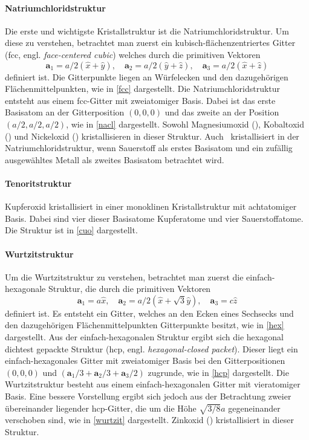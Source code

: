\paragraph{Natriumchloridstruktur}
Die erste und wichtigste Kristallstruktur ist die Natriumchloridstruktur.
Um diese zu verstehen, betrachtet man zuerst ein kubisch-flächen\-zen\-trier\-tes Gitter (fcc, engl.
\textit{face-centered cubic}) welches durch die primitiven Vektoren
\begin{equation}
    \mathbf{a}_1 = a / 2 (\hat{x} + \hat{y}), \quad
    \mathbf{a}_2 = a / 2 (\hat{y} + \hat{z}), \quad
    \mathbf{a}_3 = a / 2 (\hat{x} + \hat{z})
    \label{eq:fcc}
\end{equation}
definiert ist.
Die Gitterpunkte liegen an Würfelecken und den dazugehörigen Flächenmittelpunkten, wie in \cref{fcc} dargestellt.
\autocite[37-38]{Grundmann}
Die Natriumchloridstruktur entsteht aus einem fcc-Gitter mit zweiatomiger Basis.
Dabei ist das erste Basisatom an der Gitterposition $(0,0,0)$ und das zweite an der Position $(a/2,a/2,a/2)$, wie in
\cref{nacl} dargestellt.\autocite[45]{Grundmann}
Sowohl Magnesiumoxid (), Kobaltoxid () und Nickeloxid () kristallisieren in dieser Struktur.
Auch \heo\ kristallisiert in der Natriumchloridstruktur, wenn
Sauerstoff als erstes Basisatom und ein zufällig ausgewähltes Metall als zweites Basisatom betrachtet wird.

\paragraph{Tenoritstruktur}
Kupferoxid kristallisiert in einer monoklinen Kristall\-struk\-tur mit achtatomiger Basis.
Dabei sind vier dieser Basisatome Kupferatome und vier Sauerstoffatome.
Die Struktur ist in \cref{cuo} dargestellt.\autocite[7]{kupferoxid}

\paragraph{Wurtzitstruktur}
Um die Wurtzitstruktur zu verstehen, betrachtet man zuerst die einfach-hexagonale Struktur, die durch die primitiven
Vektoren
\begin{equation}
    \mathbf{a}_1 = a\hat{x}, \quad
    \mathbf{a}_2 = a/2 (\hat{x} + \sqrt{3} \hat{y}), \quad
    \mathbf{a}_3 = c \hat{z}
\end{equation}
definiert ist.
Es entsteht ein Gitter, welches an den Ecken eines Sechsecks und den dazugehörigen Flächenmittelpunkten Gitterpunkte
besitzt, wie in \cref{hex} dargestellt.
Aus der einfach-hexagonalen Struktur ergibt sich die hexagonal dichtest gepackte Struktur
(hcp, engl. \textit{hexagonal-closed packet}).
Dieser liegt ein einfach-hexagonales Gitter mit zweiatomiger Basis bei den Gitterpositionen $(0,0,0)$ und
$(\mathbf{a}_1/3 + \mathbf{a}_2/3 + \mathbf{a}_3/2)$ zugrunde, wie in \cref{hcp} dargestellt.\autocite[97-98]{Ashcroft}
Die Wurtzitstruktur besteht aus einem einfach-hexagonalen Gitter mit vieratomiger Basis.
Eine bessere Vorstellung ergibt sich jedoch aus der Betrachtung zweier übereinander liegender hcp-Gitter, die um
die Höhe $\sqrt {3 / 8} a$ gegeneinander verschoben sind, wie in \cref{wurtzit} dargestellt.
Zinkoxid () kristallisiert in dieser Struktur.

